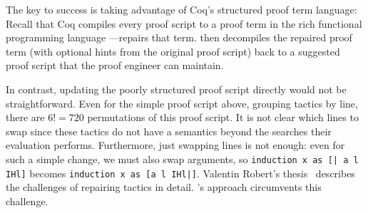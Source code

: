 The key to success is taking advantage of Coq's structured proof term language:
Recall that Coq compiles every proof script to a proof term in the rich functional programming language
---\toolnamec repairs that term.
\toolnamec then decompiles the repaired proof term (with optional hints from the original proof script) back 
to a suggested proof script that the proof engineer can maintain.

In contrast, updating the poorly structured proof script directly would not be straightforward.
Even for the simple proof script above, grouping tactics by line, there are $6! = 720$ permutations of this proof script.
It is not clear which lines to swap since these tactics do not have a semantics beyond the searches their evaluation performs.
Furthermore, just swapping lines is not enough: even for such a simple change, we must also swap
arguments, so \lstinline{induction x as [| a l IHl]} becomes \lstinline{induction x as [a l IHl|]}.
Valentin Robert's thesis~\cite{robert2018} describes the challenges of repairing tactics in detail.
\toolnamec's approach circumvents this challenge.



